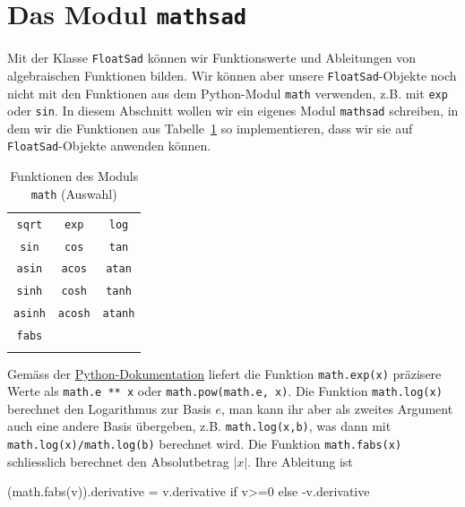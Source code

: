 \documentclass[
  letterpaper,
  DIV=11,
  oneside]{scrreprt}
\newenvironment{Shaded}{\begin{snugshade}}{\end{snugshade}}
\newcommand{\ControlFlowTok}[1]{\textcolor[rgb]{0.00,0.23,0.31}{#1}}
\newcommand{\DecValTok}[1]{\textcolor[rgb]{0.68,0.00,0.00}{#1}}
\newcommand{\NormalTok}[1]{\textcolor[rgb]{0.00,0.23,0.31}{#1}}
\newcommand{\OperatorTok}[1]{\textcolor[rgb]{0.37,0.37,0.37}{#1}}
\theoremstyle{definition}
\theoremstyle{definition}
\theoremstyle{remark}
\begin{document}
\hypertarget{das-modul-mathsad}{%
\section{\texorpdfstring{Das Modul
\texttt{mathsad}}{Das Modul mathsad}}\label{das-modul-mathsad}}

Mit der Klasse \texttt{FloatSad} können wir Funktionswerte und
Ableitungen von algebraischen Funktionen bilden. Wir können aber unsere
\texttt{FloatSad}-Objekte noch nicht mit den Funktionen aus dem
Python-Modul \texttt{math} verwenden, z.B. mit \texttt{exp} oder
\texttt{sin}. In diesem Abschnitt wollen wir ein eigenes Modul
\texttt{mathsad} schreiben, in dem wir die Funktionen aus
Tabelle~\ref{tbl-mathFunctions} so implementieren, dass wir sie auf
\texttt{FloatSad}-Objekte anwenden können.

\hypertarget{tbl-mathFunctions}{}
\begin{longtable}[]{@{}ccc@{}}
\toprule()
\endhead
\texttt{sqrt} & \texttt{exp} & \texttt{log} \\
\texttt{sin} & \texttt{cos} & \texttt{tan} \\
\texttt{asin} & \texttt{acos} & \texttt{atan} \\
\texttt{sinh} & \texttt{cosh} & \texttt{tanh} \\
\texttt{asinh} & \texttt{acosh} & \texttt{atanh} \\
\texttt{fabs} & & \\
\bottomrule()
\caption{\label{tbl-mathFunctions}Funktionen des Moduls \texttt{math}
(Auswahl)}\tabularnewline
\end{longtable}

Gemäss der
\href{https://docs.python.org/3.8/library/math.html}{Python-Dokumentation}
liefert die Funktion \texttt{math.exp(x)} präzisere Werte als
\texttt{math.e\ **\ x} oder \texttt{math.pow(math.e,\ x)}. Die Funktion
\texttt{math.log(x)} berechnet den Logarithmus zur Basis \(e\), man kann
ihr aber als zweites Argument auch eine andere Basis übergeben, z.B.
\texttt{math.log(x,b)}, was dann mit \texttt{math.log(x)/math.log(b)}
berechnet wird. Die Funktion \texttt{math.fabs(x)} schliesslich
berechnet den Absolutbetrag \(|x|\). Ihre Ableitung ist

\begin{Shaded}
\begin{Highlighting}[]
\NormalTok{(math.fabs(v)).derivative }\OperatorTok{=}\NormalTok{ v.derivative }\ControlFlowTok{if}\NormalTok{ v}\OperatorTok{\textgreater{}=}\DecValTok{0} \ControlFlowTok{else} \OperatorTok{{-}}\NormalTok{v.derivative}
\end{Highlighting}
\end{Shaded}
\end{document}
